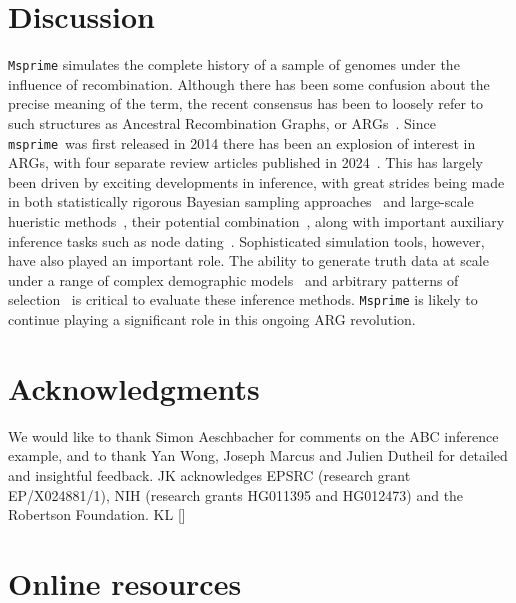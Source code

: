\documentclass[graybox]{svmult}
\newcommand{\msprime}[0]{\texttt{msprime}}
\begin{document}
\section{Discussion}
\label{sec:discussion}
\texttt{Msprime} simulates the complete history of a sample of genomes under
the influence of recombination. Although there has been some confusion about
the precise meaning of the term, the recent consensus has been to loosely
refer to such structures as Ancestral Recombination Graphs, or
ARGs~\citep{wong2024general}. Since \msprime\ was first released in 2014
there has been an explosion of interest in ARGs, with four separate
review articles published in 2024~\citep{brandt2024promise,
lewanski2024era,nielsen2024inference,wong2024general}.
This has largely been
driven by exciting developments in inference, with great strides being
made in both statistically rigorous Bayesian sampling
approaches~\citep{rasmussen2014genome,mahmoudi2022bayesian,deng2024robust}
and large-scale hueristic
methods~\cite{speidel2019method,kelleher2019inferring,
zhang2023biobank,gunnarsson2024scalable},
their potential combination~\citep{bisschop2025likelihoods},
along with important auxiliary inference tasks such as node
dating~\cite{wohns2022unified,deng2025general}.
Sophisticated simulation tools, however, have also played an important
role. The ability to generate truth data at scale
under a range of complex demographic
models~\citep{adrion2020stdpopsim,gower2022demes,lauterbur2023expanding}
and arbitrary patterns of
selection~\citep{kelleher2018efficient,haller2018tree,gower2025accessible}
is critical to evaluate these inference methods.
\texttt{Msprime} is likely to continue playing a significant role
in this ongoing ARG revolution.

\section*{Acknowledgments}

We would like to thank Simon Aeschbacher for comments on the ABC inference example,
and to thank Yan Wong, Joseph Marcus and Julien Dutheil for
detailed and insightful feedback.
JK acknowledges EPSRC (research grant EP/X024881/1),
NIH (research grants HG011395 and HG012473)
and the Robertson Foundation.
KL []

\section*{Online resources}
\end{document}
